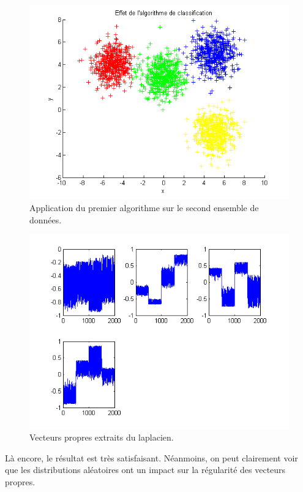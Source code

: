 \begin{figure}[H]
\centering
    \includegraphics[scale=0.6,angle=0]{Images/AlgoClssification2.png}
    \caption{Application du premier algorithme sur le second ensemble de données.}
    \label{fig:AlgoClssification2}
\end{figure}

\begin{figure}[H]
\centering
    \includegraphics[scale=0.4,angle=0]{Images/VecteursPropres2.png}
    \caption{Vecteurs propres extraits du laplacien.}
    \label{fig:VecteursPropres2}
\end{figure}

Là encore, le résultat est très satisfaisant. Néanmoins, on peut clairement voir que les distributions aléatoires ont un impact sur la régularité des vecteurs propres.


